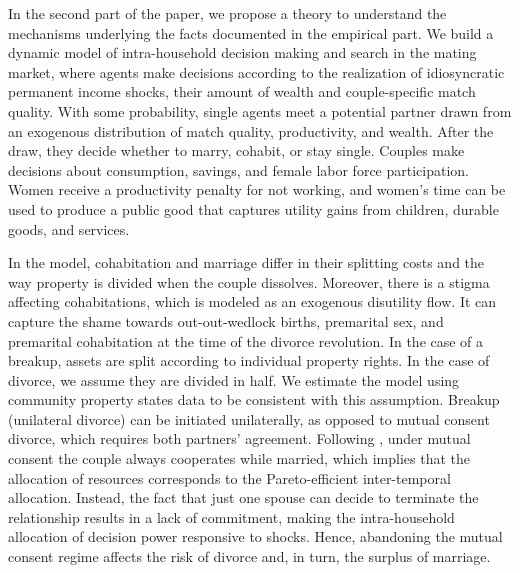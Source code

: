 \documentclass[12pt]{article}
\numberwithin{table}{section}
\begin{document}
In the second part of the paper, we propose a theory to understand the mechanisms underlying the facts documented in the empirical part. We build a dynamic model of intra-household decision making and search in the mating market, where agents make decisions according to the realization of idiosyncratic permanent income shocks, their amount of wealth and couple-specific match quality. With some probability, single agents meet a potential partner drawn from an exogenous distribution of match quality, productivity, and wealth. After the draw, they decide whether to marry, cohabit, or stay single. Couples make decisions about consumption, savings, and female labor force participation. Women receive a productivity penalty for not working, and women's time can be used to produce a public good that captures utility gains from children, durable goods, and services.

In the model, cohabitation and marriage differ in their splitting costs and the way property is divided when the couple dissolves. Moreover, there is a stigma affecting cohabitations, which is modeled as an exogenous disutility flow. It can capture the shame towards out-out-wedlock births, premarital sex, and premarital cohabitation at the time of the divorce revolution. In the case of a breakup, assets are split according to individual property rights. In the case of divorce, we assume they are divided in half. We estimate the model using community property states data to be consistent with this assumption. Breakup (unilateral divorce) can be initiated unilaterally, as opposed to mutual consent divorce, which requires both partners' agreement. Following \cite{voena2015}, under mutual consent the couple always cooperates while married, which implies that the allocation of resources corresponds to the Pareto-efficient inter-temporal allocation. %
Instead, the fact that just one spouse can decide to terminate the relationship results in a lack of commitment, making the intra-household allocation of decision power responsive to shocks. Hence, abandoning the mutual consent regime affects the risk of divorce and, in turn, the surplus of marriage. 
\end{document}
